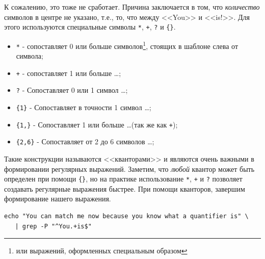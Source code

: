 \documentclass[a4paper,12pt,final,openany]{extbook}
\providecommand{\tightlist}{%
  \setlength{\itemsep}{0pt}\setlength{\parskip}{0pt}}
\begin{document}
К сожалению, это тоже не сработает. Причина заключается в том,
что \emph{количество} символов в центре не указано,
т.е., то, что между <<You>> и <<is!>>. Для этого используются специальные
символы \texttt{*}, \texttt{+}, \texttt{?} и \texttt{\{\}}.
\begin{itemize}
\tightlist
\item
  \texttt{*} - сопоставляет 0 или больше символов\footnote{или выражений, оформленных специальным образом}, стоящих в шаблоне
  слева от символа;
\item
  \texttt{+} - сопоставляет 1 или больше \ldots;
\item
  \texttt{?} - Сопоставляет 0 или 1 символ \ldots;
\item
  \texttt{\{1\}} - Сопоставляет в точности 1 символ \ldots;
\item
  \texttt{\{1,\}} - Сопоставляет 1 или больше \ldots (так же как
  \texttt{+});
\item
  \texttt{\{2,6\}} - Сопоставляет от 2 до 6 символов \ldots;
\end{itemize}

Такие конструкции называются <<кванторами>> и являются очень важными в формировании регулярных выражений. Заметим, что \emph{любой} квантор
может быть определен при помощи \texttt{\{\}}, но на практике
использование \texttt{*}, \texttt{+} и \texttt{?} позволяет создавать
регулярные выражения быстрее. При помощи кванторов, завершим формирование
нашего выражения.
\begin{verbatim}
echo "You can match me now because you know what a quantifier is" \
   | grep -P "^You.+is$"
\end{verbatim}
\end{document}
